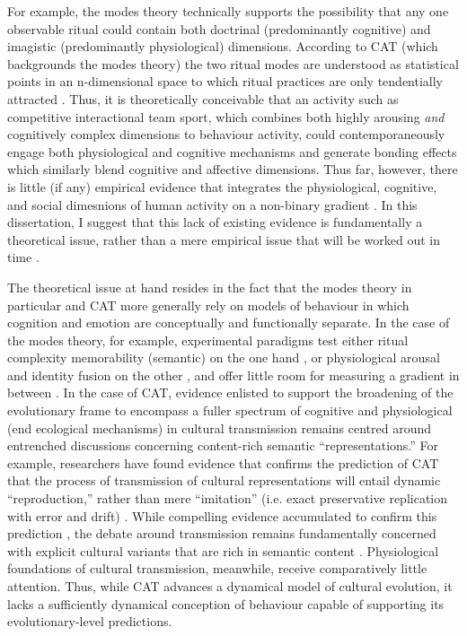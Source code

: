 \begin{CJK}{UTF8}{gbsn}
For example, the modes theory technically supports the possibility that any one observable ritual could contain both doctrinal (predominantly cognitive) and imagistic (predominantly physiological) dimensions.  According to CAT (which backgrounds the modes theory) the two ritual modes are understood as statistical points in an n-dimensional space to which ritual practices are only tendentially attracted \citep{Scott-Phillips2017}.  Thus, it is theoretically conceivable that an activity such as competitive interactional team sport, which combines both highly arousing \textit{and} cognitively complex dimensions to behaviour activity,  could contemporaneously engage both physiological and cognitive mechanisms and generate bonding effects which similarly blend cognitive and affective dimensions.   Thus far, however, there is little (if any) empirical evidence that integrates the physiological, cognitive, and social dimesnions of human activity on a non-binary gradient \citep{Atran2010}.  In this dissertation, I suggest that this lack of existing evidence is fundamentally a theoretical issue, rather than a mere empirical issue that will be worked out in time \citep{Whitehouse2014a}.

The theoretical issue at hand resides in the fact that the modes theory in particular and CAT more generally rely on models of behaviour in which cognition and emotion are conceptually and functionally separate.  In the case of the modes theory, for example, experimental paradigms test either ritual complexity memorability (semantic) on the one hand \citep{Whitehouse2005}, or physiological arousal and identity fusion on the other \citep{Whitehouse2014,Whitehouse2017,Swann2010a,Richert2005}, and offer little room for measuring a gradient in between \citep[but see][]{Russell2014}.  In the case of CAT, evidence enlisted to support the broadening of the evolutionary frame to encompass a fuller spectrum of cognitive and physiological (end ecological mechanisms) in cultural transmission remains centred around entrenched discussions concerning content-rich semantic ``representations.''  For example, researchers have found evidence that confirms the prediction of CAT that the process of transmission of cultural representations will entail dynamic ``reproduction,'' rather than mere ``imitation'' (i.e. exact preservative replication with error and drift) \citep{Mesoudi2017}.  While compelling evidence accumulated to confirm this prediction \citep[e.g.,][]{Morin2016,Scott-Phillips2017a}, the debate around transmission remains fundamentally concerned with explicit cultural variants that are rich in semantic content \citep[e.g. language, literature, and concrete cultural artefacts, see][]{Ramstead2016,Lerique2016}.  Physiological foundations of cultural transmission, meanwhile, receive comparatively little attention.  Thus, while CAT advances a dynamical model of cultural evolution, it lacks a sufficiently dynamical conception of behaviour capable of supporting its evolutionary-level predictions.


\end{CJK}
